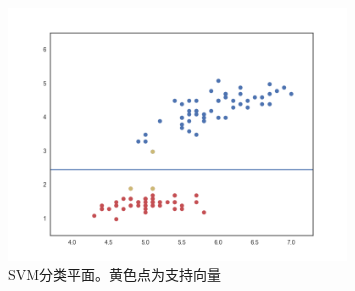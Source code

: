 \documentclass{ctexart}
\begin{document}
\begin{figure}[H]
\begin{center}
\includegraphics[width=0.8\textwidth]{fig/linear_kernel.png} %
\caption{SVM分类平面。黄色点为支持向量}
\end{center}
\end{figure}
%
%
%
%
\end{document}
